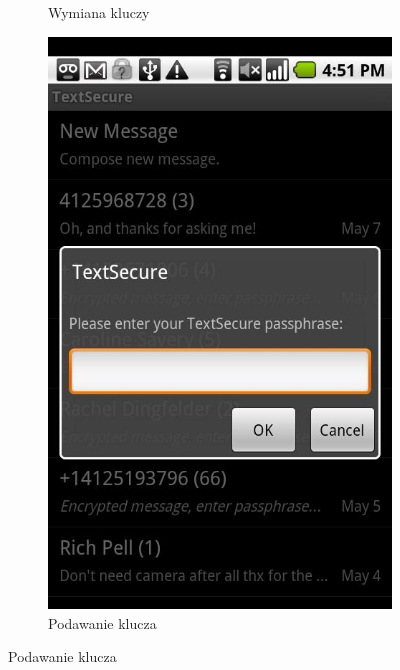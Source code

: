 \documentclass[xcolor=table]{beamer}
\begin{document}
\begin{frame}
\begin{center}
\begin{figure}
\begin{subfigure}[b]{0.4\textwidth}
              \caption{Wymiana kluczy}
            \end{subfigure}
            \quad
             \begin{subfigure}[b]{0.4\textwidth}
              \centering
              \includegraphics[width=\textwidth]{textsecure2}
              \caption{Podawanie klucza}
            \end{subfigure}       
        \end{figure}
      \end{center}
\end{frame}

\end{document}
